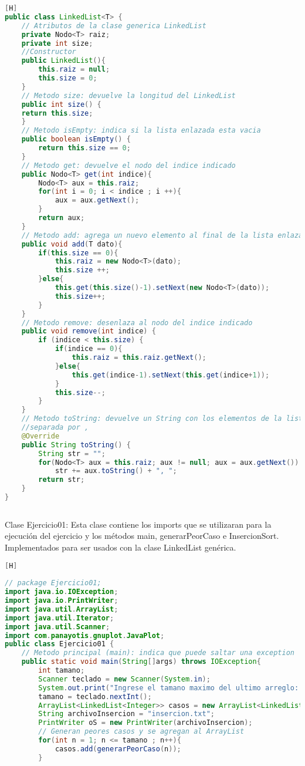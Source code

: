 \begin{enumerate}[{Ejercicio} 1.]
\begin{lstlisting}[language=java, caption={LinkedList}][H]
public class LinkedList<T> {
    // Atributos de la clase generica LinkedList
    private Nodo<T> raiz;
    private int size;
    //Constructor
    public LinkedList(){
        this.raiz = null;
        this.size = 0;
    }
    // Metodo size: devuelve la longitud del LinkedList
    public int size() {
	return this.size;
    }
    // Metodo isEmpty: indica si la lista enlazada esta vacia
    public boolean isEmpty() {
        return this.size == 0;
    }
    // Metodo get: devuelve el nodo del indice indicado
    public Nodo<T> get(int indice){
        Nodo<T> aux = this.raiz;
        for(int i = 0; i < indice ; i ++){
            aux = aux.getNext();
        }
        return aux;
    }
    // Metodo add: agrega un nuevo elemento al final de la lista enlazada
    public void add(T dato){
        if(this.size == 0){
            this.raiz = new Nodo<T>(dato);
            this.size ++;
        }else{
            this.get(this.size()-1).setNext(new Nodo<T>(dato));
            this.size++;
        }
    }
    // Metodo remove: desenlaza al nodo del indice indicado
    public void remove(int indice) {
        if (indice < this.size) {
            if(indice == 0){
                this.raiz = this.raiz.getNext();
            }else{
                this.get(indice-1).setNext(this.get(indice+1));
            }
            this.size--;
        }
    }
    // Metodo toString: devuelve un String con los elementos de la lista enlazada 
    //separada por ,
    @Override
    public String toString() {
        String str = "";
        for(Nodo<T> aux = this.raiz; aux != null; aux = aux.getNext())
            str += aux.toString() + ", ";
        return str;
    }
}
		
	\end{lstlisting}
	Clase Ejercicio01: Esta clase contiene los imports que se utilizaran para la ejecución del ejercicio y los métodos main, generarPeorCaso e InsercionSort. Implementados para ser usados con la clase LinkedList genérica.
	\begin{lstlisting}[language=java, caption={Main}][H]
		
// package Ejercicio01;
import java.io.IOException;
import java.io.PrintWriter;
import java.util.ArrayList;
import java.util.Iterator;
import java.util.Scanner;
import com.panayotis.gnuplot.JavaPlot;
public class Ejercicio01 {
    // Metodo principal (main): indica que puede saltar una exception 
    public static void main(String[]args) throws IOException{
        int tamano;
        Scanner teclado = new Scanner(System.in);
        System.out.print("Ingrese el tamano maximo del ultimo arreglo: ");
        tamano = teclado.nextInt();
        ArrayList<LinkedList<Integer>> casos = new ArrayList<LinkedList<Integer>>();
        String archivoInsercion = "insercion.txt";
        PrintWriter oS = new PrintWriter(archivoInsercion);
        // Generan peores casos y se agregan al ArrayList
        for(int n = 1; n <= tamano ; n++){
            casos.add(generarPeorCaso(n));
        }
        

\end{lstlisting}
\end{enumerate}
